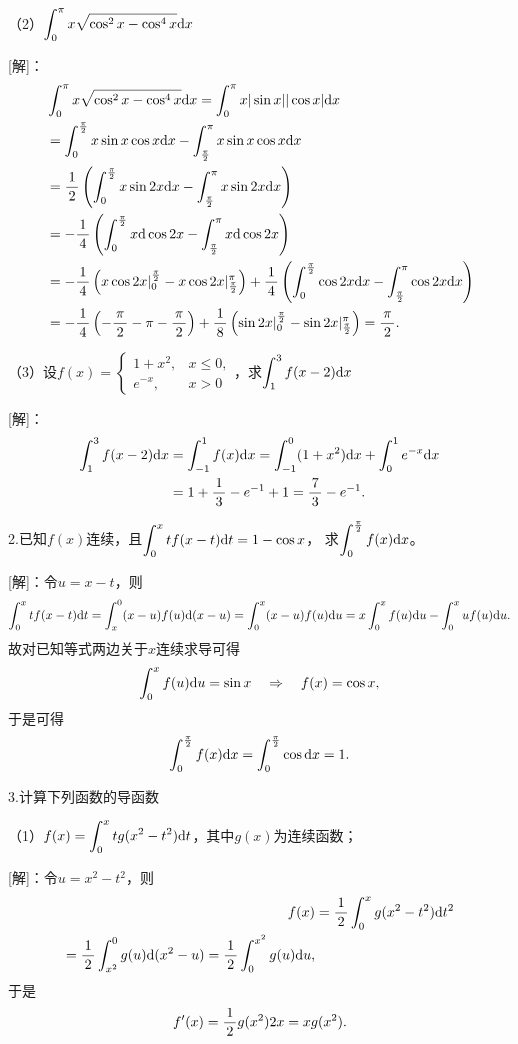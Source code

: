 （2）$\dint_0^{\pi}x\sqrt{\cos^2x-\cos^4x}\d x$

[解]：
\begin{align*}
	&\dint_0^{\pi}x\sqrt{\cos^2x-\cos^4x}\d x
	=\dint_0^{\pi}x|\sin x||\cos x|\d x\\
	&=\dint_0^{\frac{\pi}2}x\sin x\cos x\d x
	-\dint_{\frac{\pi}2}^{\pi}x\sin x\cos x\d x\\
	&=\df12\left(\dint_0^{\frac{\pi}2}x\sin2x\d x
	-\dint_{\frac{\pi}2}^{\pi}x\sin2x\d x\right)\\
	&=-\df14\left(\dint_0^{\frac{\pi}2}x\d\cos2x
	-\dint_{\frac{\pi}2}^{\pi}x\d\cos2x\right)\\
	&=-\df14\left(x\cos2x|_0^{\frac{\pi}2}
	-x\cos2x|_{\frac{\pi}2}^{\pi}\right)+
	\df14\left(\dint_0^{\frac{\pi}2}\cos2x\d x
	-\dint_{\frac{\pi}2}^{\pi}\cos2x\d x\right)\\
	&=-\df14\left(-\df{\pi}2-\pi-\df{\pi}2\right)
	+\df18\left(\sin2x|_0^{\frac{\pi}2}
	-\sin2x|_{\frac{\pi}2}^{\pi}\right)=\df{\pi}2.
\end{align*}

（3）设$f(x)=\left\{\begin{array}{ll}
	1+x^2, & x\leq0,\\ e^{-x}, & x>0
\end{array}\right.$，求$\dint_1^3f(x-2)\d x$

[解]：
\begin{align*}
	\dint_1^3f(x-2)\d x
	&=\dint_{-1}^1f(x)\d x
	=\dint_{-1}^0(1+x^2)\d x+\dint_0^1e^{-x}\d x\\
	&=1+\df13-e^{-1}+1=\df73-e^{-1}.
\end{align*}
\fin

\bs

2.已知$f(x)$连续，且$\dint_0^xtf(x-t)\d t=1-\cos x$，
求$\dint_0^{\frac{\pi}2}f(x)\d x$。

[解]：令$u=x-t$，则
$$\dint_0^xtf(x-t)\d t=\dint_x^0(x-u)f(u)\d(x-u)
=\dint_0^x(x-u)f(u)\d u=x\dint_0^xf(u)\d u-\dint_0^xuf(u)\d u.$$
故对已知等式两边关于$x$连续求导可得
$$\dint_0^xf(u)\d u=\sin x
\quad\Rightarrow\quad
f(x)=\cos x,$$
于是可得
$$\dint_0^{\frac{\pi}2}f(x)\d x=\dint_0^{\frac{\pi}2}\cos\d x=1.$$
\fin

\bs

3.计算下列函数的导函数

（1）$f(x)=\dint_0^xtg(x^2-t^2)\d t$，其中$g(x)$为连续函数；

[解]：令$u=x^2-t^2$，则
\begin{align*}
	f(x)&=\df12\dint_0^xg(x^2-t^2)\d t^2\\
	=\df12\dint_{x^2}^0g(u)\d(x^2-u)
	=\df12\dint_0^{x^2}g(u)\d u,
\end{align*}
于是
$$f'(x)=\df12g(x^2)2x=xg(x^2).$$

